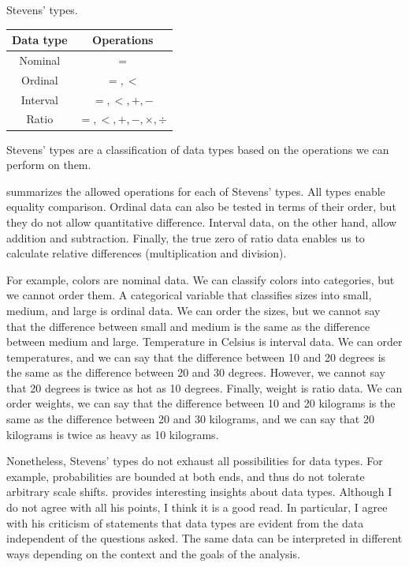 \begin{tablebox}[label=tab:stevens]{Stevens' types.}
  \centering
  \begin{tabular}{cc}
    \toprule
    \textbf{Data type} & \textbf{Operations} \\
    \midrule
    Nominal & $=$ \\
    Ordinal & $=, <$ \\
    Interval & $=, <, +, - $ \\
    Ratio & $=, <, +, -, \times, \div$ \\
    \bottomrule
  \end{tabular}
  \tcblower
  Stevens' types are a classification of data types based on the operations we can perform
  on them.
\end{tablebox}

 summarizes the allowed operations for each of Stevens' types.  All types
enable equality comparison.  Ordinal data can also be tested in terms of their order, but
they do not allow quantitative difference.  Interval data, on the other hand, allow
addition and subtraction.  Finally, the true zero of ratio data enables us to calculate
relative differences (multiplication and division).

For example, colors are nominal data.  We can classify colors into categories, but we cannot
order them.  A categorical variable that classifies sizes into small, medium, and large is
ordinal data.  We can order the sizes, but we cannot say that the difference between small
and medium is the same as the difference between medium and large.  Temperature in Celsius
is interval data.  We can order temperatures, and we can say that the difference between
10 and 20 degrees is the same as the difference between 20 and 30 degrees.  However, we
cannot say that 20 degrees is twice as hot as 10 degrees.  Finally, weight is ratio data.
We can order weights, we can say that the difference between 10 and 20 kilograms is the
same as the difference between 20 and 30 kilograms, and we can say that 20 kilograms is
twice as heavy as 10 kilograms.

Nonetheless, Stevens' types do not exhaust all possibilities for data types.  For example,
probabilities are bounded at both ends, and thus do not tolerate arbitrary scale shifts.
\textcite{Paul1993} provides interesting insights about data types.  Although I do not
agree with all his points, I think it is a good read.  In particular, I agree with
his criticism of statements that data types are evident from the data independent of the
questions asked.  The same data can be interpreted in different ways depending on the
context and the goals of the analysis.

